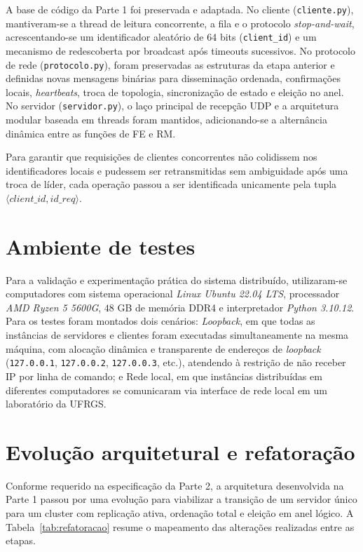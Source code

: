 \documentclass[12pt,a4paper]{article}
\newcommand{\arquivo}[1]{\texttt{#1}}
\begin{document}
A base de código da Parte 1 foi preservada e adaptada. No cliente (\arquivo{cliente.py}), mantiveram-se a thread de leitura concorrente, a fila e o protocolo \textit{stop-and-wait}, acrescentando-se um identificador aleatório de 64 bits (\arquivo{client\_id}) e um mecanismo de redescoberta por broadcast após timeouts sucessivos. No protocolo de rede (\arquivo{protocolo.py}), foram preservadas as estruturas da etapa anterior e definidas novas mensagens binárias para disseminação ordenada, confirmações locais, \textit{heartbeats}, troca de topologia, sincronização de estado e eleição no anel. No servidor (\arquivo{servidor.py}), o laço principal de recepção UDP e a arquitetura modular baseada em threads foram mantidos, adicionando-se a alternância dinâmica entre as funções de FE e RM.

Para garantir que requisições de clientes concorrentes não colidissem nos identificadores locais e pudessem ser retransmitidas sem ambiguidade após uma troca de líder, cada operação passou a ser identificada unicamente pela tupla $\langle client\_id, id\_req \rangle$.

\section{Ambiente de testes}

    Para a validação e experimentação prática do sistema distribuído, utilizaram-se computadores com sistema operacional \textit{Linux Ubuntu 22.04 LTS}, processador \textit{AMD Ryzen 5 5600G}, $48$ GB de memória DDR4 e interpretador \textit{Python 3.10.12}.
Para os testes foram montados dois cenários: \textit{Loopback}, em que todas as instâncias de servidores e clientes foram executadas simultaneamente na mesma máquina, com alocação dinâmica e transparente de endereços de \textit{loopback} (\texttt{127.0.0.1}, \texttt{127.0.0.2}, \texttt{127.0.0.3}, etc.), atendendo à restrição de não receber IP por linha de comando; e Rede local, em que instâncias distribuídas em diferentes computadores se comunicaram via interface de rede local em um laboratório da UFRGS.




\section{Evolução arquitetural e refatoração}

Conforme requerido na especificação da Parte 2, a arquitetura desenvolvida na Parte 1 passou por uma evolução para viabilizar a transição de um servidor único para um cluster com replicação ativa, ordenação total e eleição em anel lógico. A Tabela~\ref{tab:refatoracao} resume o mapeamento das alterações realizadas entre as etapas.
\end{document}
